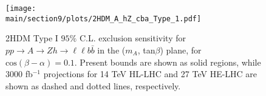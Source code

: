 \begin{figure}[h!]
\begin{center}
\texttt{[image: \\main/section9/plots/2HDM\_A\_hZ\_cba\_Type\_1.pdf]}
\caption{\small 2HDM Type I $95\%$ C.L. exclusion sensitivity for $p p \to A \to Z h \to \ell\ell b \bar{b}$ 
in the ($m_{A}$, tan$\beta$) plane, for $\mathrm{cos}(\beta-\alpha) = 0.1$. 
Present bounds are shown as solid regions, while $3000$ fb$^{-1}$ projections for 14 TeV HL-LHC and 27 TeV HE-LHC
are shown as dashed and dotted lines, respectively.}
\label{A_hZ_HL-HE}
\end{center}
\end{figure}


